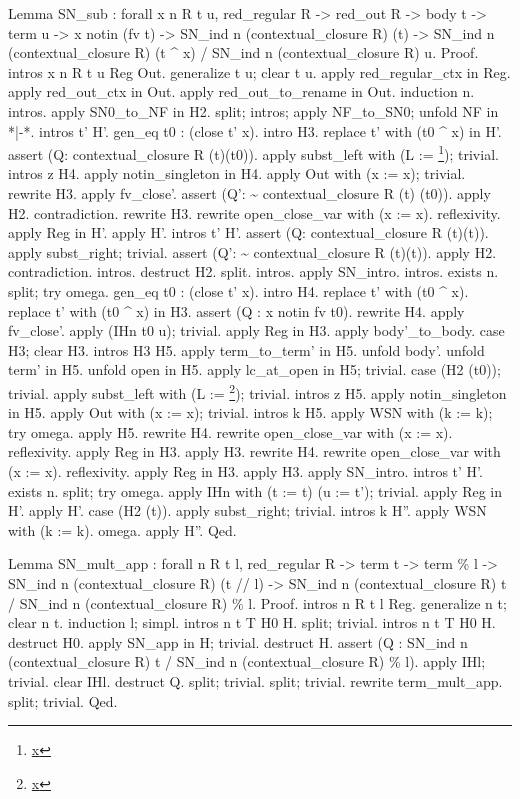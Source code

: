 \documentclass[12pt]{report}
\begin{document}
Lemma SN\_sub : forall x n R t u, red\_regular R -> red\_out R -> 
               body t -> term u -> x notin (fv t) -> 
               SN\_ind n (contextual\_closure R) (t) ->
               SN\_ind n (contextual\_closure R) (t \^{} x) /
               SN\_ind n (contextual\_closure R) u.
Proof.
 intros x n R t u Reg Out.
 generalize t u; clear t u.
 apply red\_regular\_ctx in Reg. 
 apply red\_out\_ctx in Out. 
 apply red\_out\_to\_rename in Out.
 induction n. intros. 
 apply SN0\_to\_NF in H2. split; intros;
 apply NF\_to\_SN0; unfold NF in *|-*.
 intros t' H'. gen\_eq t0 : (close t' x). intro H3.
 replace t' with (t0 \^{} x) in H'.
 assert (Q: contextual\_closure R (t)(t0)).
    apply subst\_left with (L := \footnote{\url{x}}); trivial. intros z H4. 
    apply notin\_singleton in H4. apply Out with (x := x); trivial.
    rewrite H3. apply fv\_close'.
 assert (Q': \~{} contextual\_closure R (t) (t0)).
    apply H2.
 contradiction. rewrite H3. rewrite open\_close\_var with (x := x).
 reflexivity. apply Reg in H'. apply H'.
 intros t' H'.
 assert (Q: contextual\_closure R (t)(t)).
   apply subst\_right; trivial. 
 assert (Q': \~{} contextual\_closure R (t)(t)).
   apply H2.
 contradiction.
 intros. destruct H2. split. intros. apply SN\_intro.
 intros. exists n. split; try omega.
 gen\_eq t0 : (close t' x). intro H4.
 replace t' with (t0 \^{} x). replace t' with (t0 \^{} x) in H3.
 assert (Q : x notin fv t0). rewrite H4. apply fv\_close'.
 apply (IHn t0 u); trivial. apply Reg in H3.
 apply body'\_to\_body. case H3; clear H3. intros H3 H5.
 apply term\_to\_term' in H5. unfold body'. unfold term' in H5.
 unfold open in H5. apply lc\_at\_open in H5; trivial.
 case (H2 (t0)); trivial.
 apply subst\_left with (L := \footnote{\url{x}}); trivial.
 intros z H5. apply notin\_singleton in H5. 
 apply Out with (x := x); trivial.
 intros k H5. apply WSN with (k := k); try omega. apply H5.
 rewrite H4. rewrite open\_close\_var with (x := x).
 reflexivity. apply Reg in H3. apply H3.
 rewrite H4. rewrite open\_close\_var with (x := x).
 reflexivity. apply Reg in H3. apply H3.
 apply SN\_intro.
 intros t' H'. exists n.
 split; try omega. 
 apply IHn with (t := t) (u := t'); trivial.
 apply Reg in H'. apply H'.
 case (H2 (t)).
 apply subst\_right; trivial. 
 intros k H''. apply WSN with (k := k).
 omega. apply H''.
Qed.


Lemma SN\_mult\_app : forall n R t l, red\_regular R ->  term t -> term \% l -> 
               SN\_ind n (contextual\_closure R) (t // l) ->
               SN\_ind n (contextual\_closure R) t / SN\_ind n (contextual\_closure R) \% l.
Proof.
 intros n R t l Reg. generalize n t; clear n t.
 induction l; simpl. intros n t T H0 H. split; trivial.
 intros n t T H0 H. destruct H0. apply SN\_app in H; trivial. destruct H.
 assert (Q : SN\_ind n (contextual\_closure R) t / SN\_ind n (contextual\_closure R) \% l). 
  apply IHl; trivial.
 clear IHl. destruct Q. split; trivial. split; trivial.
 rewrite term\_mult\_app. split; trivial. 
Qed. 
\end{document}
